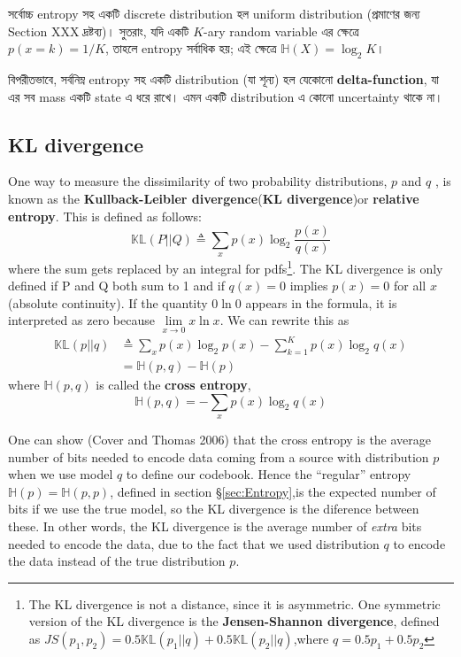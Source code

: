 \documentclass[graybox, envcountchap, twocolumn]{styles/svmult}
\begin{document}
{\bengalifont সর্বোচ্চ entropy সহ একটি discrete distribution হল uniform distribution (প্রমাণের জন্য Section XXX দ্রষ্টব্য)। সুতরাং, যদি একটি $K$-ary random variable এর ক্ষেত্রে $p(x=k) = 1/K$, তাহলে entropy সর্বাধিক হয়; এই ক্ষেত্রে $\mathbb{H}(X) = \log_2 K$।}

{\bengalifont বিপরীতভাবে, সর্বনিম্ন entropy সহ একটি distribution (যা শূন্য) হল যেকোনো \textbf{delta-function}, যা এর সব mass একটি state এ ধরে রাখে। এমন একটি distribution এ কোনো uncertainty থাকে না।}


\subsection{KL divergence}
One way to measure the dissimilarity of two probability distributions, $p$ and $q$ , is known as the \textbf{Kullback-Leibler divergence}(\textbf{KL divergence})or \textbf{relative entropy}. This is defined as follows:
\begin{equation}
\mathbb{KL}(P||Q) \triangleq 
\sum\limits_{x}{p(x)\log_2\dfrac{p(x)}{q(x)}}
\end{equation}
where the sum gets replaced by an integral for pdfs\footnote{The KL divergence is not a distance, since it is asymmetric. One symmetric version of the KL divergence is the \textbf{Jensen-Shannon divergence}, defined as $JS(p_1,p_2)=0.5\mathbb{KL}(p_1||q)+0.5\mathbb{KL}(p_2||q)$,where $q=0.5p_1+0.5p_2$}. The KL divergence is only defined if P and Q both sum to 1 and if $q(x)=0$ implies $p(x)=0$ for all $x$(absolute continuity). If the quantity  $0\ln0$ appears in the formula, it is interpreted as zero because $\lim\limits_{x \to 0}x\ln x$. We can rewrite this as
\begin{equation}\begin{split}
\mathbb{KL}(p||q) & \triangleq \sum\limits_{x}{p(x)\log_2p(x)}-\sum\limits_{k=1}^{K}{p(x)\log_2q(x)} \\
    & =\mathbb{H}(p,q)-\mathbb{H}(p)
\end{split}\end{equation}
where $\mathbb{H}(p,q)$ is called the \textbf{cross entropy},
\begin{equation}\label{eqn:cross-entropy}
\mathbb{H}(p,q)=-\sum\limits_{x}{p(x)\log_2q(x)}
\end{equation}

One can show (Cover and Thomas 2006) that the cross entropy is the average number of bits needed to encode data coming from a source with distribution $p$ when we use model $q$ to define our codebook. Hence the “regular” entropy $\mathbb{H}(p)=\mathbb{H}(p,p)$, defined in section \S \ref{sec:Entropy},is the expected number of bits if we use the true model, so the KL divergence is the diference between these. In other words, the KL divergence is the average number of \emph{extra} bits needed to encode the data, due to the fact that we used distribution $q$ to encode the data instead of the true distribution $p$.
\end{document}
